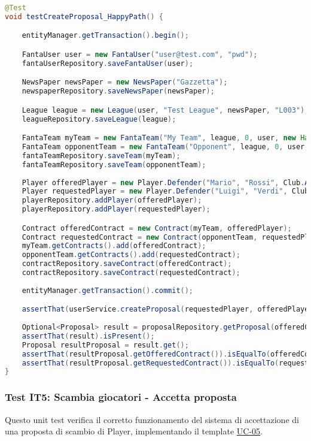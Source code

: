 \begin{lstlisting}[language=Java]
@Test
void testCreateProposal_HappyPath() {

	entityManager.getTransaction().begin();

	FantaUser user = new FantaUser("user@test.com", "pwd");
	fantaUserRepository.saveFantaUser(user);

	NewsPaper newsPaper = new NewsPaper("Gazzetta");
	newspaperRepository.saveNewsPaper(newsPaper);

	League league = new League(user, "Test League", newsPaper, "L003");
	leagueRepository.saveLeague(league);

    FantaTeam myTeam = new FantaTeam("My Team", league, 0, user, new HashSet<>());
    FantaTeam opponentTeam = new FantaTeam("Opponent", league, 0, user, new HashSet<>());
	fantaTeamRepository.saveTeam(myTeam);
	fantaTeamRepository.saveTeam(opponentTeam);
		
	Player offeredPlayer = new Player.Defender("Mario", "Rossi", Club.ATALANTA);
	Player requestedPlayer = new Player.Defender("Luigi", "Verdi", Club.BOLOGNA);
	playerRepository.addPlayer(offeredPlayer);
	playerRepository.addPlayer(requestedPlayer);

	Contract offeredContract = new Contract(myTeam, offeredPlayer);
	Contract requestedContract = new Contract(opponentTeam, requestedPlayer);
	myTeam.getContracts().add(offeredContract);
	opponentTeam.getContracts().add(requestedContract);
	contractRepository.saveContract(offeredContract);
	contractRepository.saveContract(requestedContract);
		
	entityManager.getTransaction().commit();

	assertThat(userService.createProposal(requestedPlayer, offeredPlayer, myTeam, opponentTeam)).isTrue();
		
	Optional<Proposal> result = proposalRepository.getProposal(offeredContract, requestedContract);
	assertThat(result).isPresent();
	Proposal resultProposal = result.get();
	assertThat(resultProposal.getOfferedContract()).isEqualTo(offeredContract);
	assertThat(resultProposal.getRequestedContract()).isEqualTo(requestedContract);
}
\end{lstlisting}


\subsubsection{Test IT5: Scambia giocatori - Accetta proposta} \label{IT5}

Questo unit test verifica il corretto funzionamento del sistema di accettazione di una proposta di scambio di Player,
implementando il template \hyperref[UC-05]{UC-05}.

